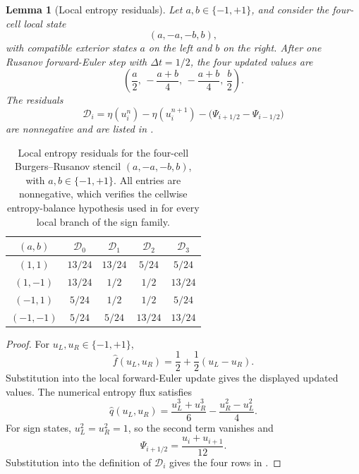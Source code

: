 \documentclass[a4paper,fleqn, sort&compress]{cas-sc}
\newtheorem{lemma}[theorem]{Lemma}
\theoremstyle{remark}
\theoremstyle{definition}
\begin{document}
\begin{lemma}[Local entropy residuals]
\label{lem:local-entropy-residuals}
Let \(a,b\in\{-1,+1\}\), and consider the four-cell local state
\[
  (a,-a,-b,b),
\]
with compatible exterior states \(a\) on the left and \(b\) on the right.
After one Rusanov forward-Euler step with \(\Delta t=1/2\), the four updated
values are
\[
  \left(
  \frac a2,\,
  -\frac{a+b}{4},\,
  -\frac{a+b}{4},\,
  \frac b2
  \right).
\]
The residuals
\[
  \mathcal D_i
  =
  \eta(u_i^n)-\eta(u_i^{n+1})
  -
  \bigl(\Psi_{i+1/2}-\Psi_{i-1/2}\bigr)
\]
are nonnegative and are listed in .
\end{lemma}

\begin{table}[htbp]
\centering
\caption{Local entropy residuals for the four-cell Burgers--Rusanov stencil
\((a,-a,-b,b)\), with \(a,b\in\{-1,+1\}\).  All entries are nonnegative,
which verifies the cellwise entropy-balance hypothesis used in
 for every local branch of the sign family.}
\label{tab:local-entropy-residuals}
\begin{tabular}{@{}ccccc@{}}
\toprule
\((a,b)\) & \(\mathcal D_0\) & \(\mathcal D_1\) & \(\mathcal D_2\) & \(\mathcal D_3\) \\
\midrule
\((1,1)\)     & \(13/24\) & \(13/24\) & \(5/24\)  & \(5/24\)  \\
\((1,-1)\)    & \(13/24\) & \(1/2\)   & \(1/2\)   & \(13/24\) \\
\((-1,1)\)    & \(5/24\)  & \(1/2\)   & \(1/2\)   & \(5/24\)  \\
\((-1,-1)\)   & \(5/24\)  & \(5/24\)  & \(13/24\) & \(13/24\) \\
\bottomrule
\end{tabular}
\end{table}

\begin{proof}
For \(u_L,u_R\in\{-1,+1\}\),
\[
  \widehat f(u_L,u_R)
  =
  \frac12+\frac12(u_L-u_R).
\]
Substitution into the local forward-Euler update gives the displayed updated
values.  The numerical entropy flux satisfies
\[
  \widehat q(u_L,u_R)
  =
  \frac{u_L^3+u_R^3}{6}
  -
  \frac{u_R^2-u_L^2}{4}.
\]
For sign states, \(u_L^2=u_R^2=1\), so the second term vanishes and
\[
  \Psi_{i+1/2}
  =
  \frac{u_i+u_{i+1}}{12}.
\]
Substitution into the definition of \(\mathcal D_i\) gives the four rows in
.
\end{proof}
\end{document}
